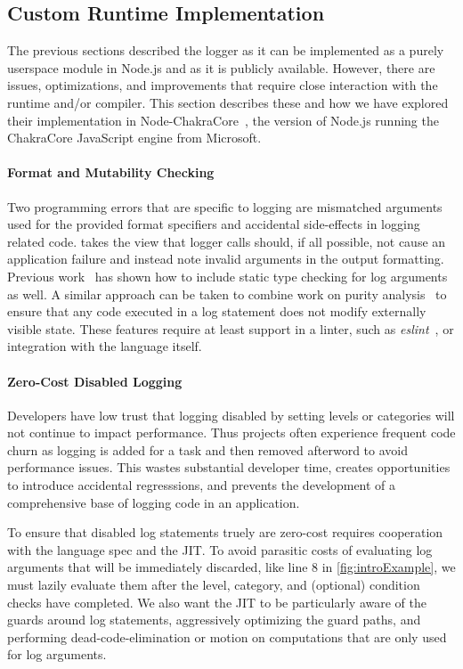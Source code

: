 \subsection{Custom Runtime Implementation}
\label{sec:runtimesupport}
The previous sections described the \projn logger as it can be implemented as a purely 
userspace module in Node.js and as it is publicly available. However, there are 
issues, optimizations, and improvements that require close interaction with the 
runtime and/or compiler. This section describes these and how we have explored their 
implementation in Node-ChakraCore~\cite{NodeChakraCore}, the version of Node.js running the ChakraCore 
JavaScript engine from Microsoft. 

\paragraph{Format and Mutability Checking}
\noindent
Two programming errors that are specific to logging are mismatched arguments used 
for the provided format specifiers and accidental side-effects in logging related 
code. \projn takes the view that logger calls should, if all possible, not cause 
an application failure and instead note invalid arguments in the output formatting. 
Previous work~\cite{tyepcheckprintf} has shown how to include static type 
checking for log arguments as well. A similar approach can be taken to combine 
work on purity analysis~\cite{choipurity,mypurity} to ensure that any code executed 
in a log statement does not modify externally visible state. These features require 
at least support in a linter, such as \emph{eslint}~\cite{eslint}, or integration 
with the language itself.

\paragraph{Zero-Cost Disabled Logging}
\noindent
Developers have low trust that logging disabled by setting levels or categories 
will not continue to impact performance. Thus projects often experience frequent 
code churn as logging is added for a task and then removed afterword to avoid 
performance issues. This wastes substantial developer time, creates opportunities 
to introduce accidental regresssions, and prevents the development of a comprehensive 
base of logging code in an application. 

To ensure that disabled log statements truely are zero-cost requires cooperation 
with the language spec and the JIT. To avoid parasitic costs of evaluating log 
arguments that will be immediately discarded, like line 8 in \autoref{fig:introExample}, 
we must lazily evaluate them after the level, category, and (optional) condition 
checks have completed. We also want the JIT to be particularly aware of the guards 
around log statements, aggressively optimizing the guard paths, and performing 
dead-code-elimination or motion on computations that are only used for log arguments.

